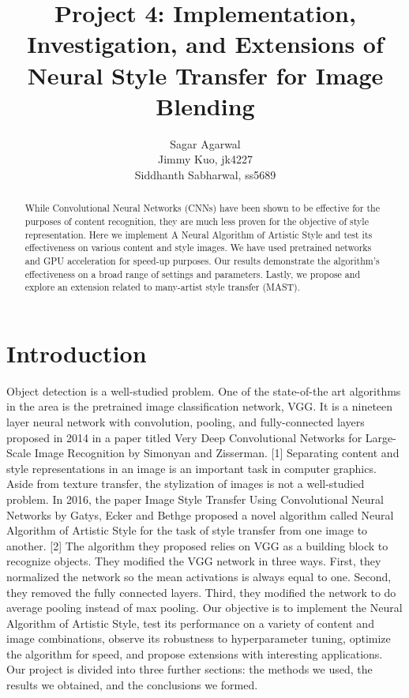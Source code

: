 \documentclass{article}
\title{Project 4: Implementation, Investigation, and Extensions of Neural Style Transfer for Image Blending}
\author{Sagar Agarwal\\Jimmy Kuo, jk4227\\ Siddhanth Sabharwal, ss5689}
\begin{document}
\maketitle

\begin{abstract}

\noindent While Convolutional Neural Networks (CNNs) have been shown to be effective for the purposes of content recognition, they are much less proven for the objective of style representation. Here we implement A Neural Algorithm of Artistic Style and test its effectiveness on various content and style images. We have used pretrained networks and GPU acceleration for speed-up purposes. Our results demonstrate the algorithm's effectiveness on a broad range of settings and parameters. Lastly, we propose and explore an extension related to many-artist style transfer (MAST).

\end{abstract}

\section{Introduction}

Object detection is a well-studied problem. One of the state-of-the art algorithms in the area is the pretrained image classification network, VGG. It is a nineteen layer neural network with convolution, pooling, and fully-connected layers proposed in 2014 in a paper titled Very Deep Convolutional Networks for Large-Scale Image Recognition by Simonyan and Zisserman. [1] Separating content and style representations in an image is an important task in computer graphics. Aside from texture transfer, the stylization of images is not a well-studied problem. In 2016, the paper Image Style Transfer Using Convolutional Neural Networks by Gatys, Ecker and Bethge proposed a novel algorithm called Neural Algorithm of Artistic Style for the task of style transfer from one image to another. [2] The algorithm they proposed relies on VGG as a building block to recognize objects. They modified the VGG network in three ways. First, they normalized the network so the mean activations is always equal to one. Second, they removed the fully connected layers. Third, they modified the network to do average pooling instead of max pooling. Our objective is to implement the Neural Algorithm of Artistic Style, test its performance on a variety of content and image combinations, observe its robustness to hyperparameter tuning, optimize the algorithm for speed, and propose extensions with interesting applications. Our project is divided into three further sections: the methods we used, the results we obtained, and the conclusions we formed.
\end{document}
